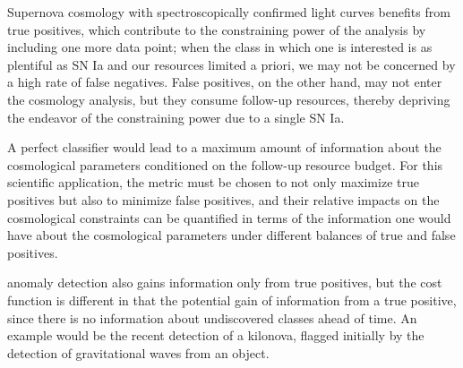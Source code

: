 \label{sec:spec_sncosmo}
Supernova cosmology with spectroscopically confirmed light curves benefits from true positives, which contribute to the constraining power of the analysis by including one more data point;
when the class in which one is interested is as plentiful as SN Ia and our resources limited a priori, we may not be concerned by a high rate of false negatives.
False positives, on the other hand, may not enter the cosmology analysis, but they consume follow-up resources, thereby depriving the endeavor of the constraining power due to a single SN Ia.

A perfect classifier would lead to a maximum amount of information about the cosmological parameters conditioned on the follow-up resource budget.
For this scientific application, the metric must be chosen to not only maximize true positives but also to minimize false positives, and their relative impacts on the cosmological constraints can be quantified in terms of the information one would have about the cosmological parameters under different balances of true and false positives.

\label{sec:anom}
 anomaly detection also gains information only from true positives, but the cost function is different in that the potential gain of information from a true positive, since there is no information about undiscovered classes ahead of time.
An example would be the recent detection of a kilonova, flagged initially by the detection of gravitational waves from an object.

